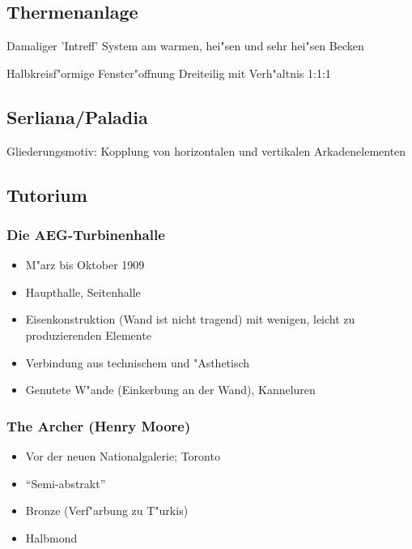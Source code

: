 \documentclass[emulatestandardclasses]{scrartcl}
\begin{document}
\subsection{Thermenanlage}

\begin{description}[leftmargin=!,labelwidth=\widthof{\bfseries Thermenfenster}]
  \item[Hintergrund] Damaliger 'Intreff' System am warmen, hei"sen und sehr hei"sen Becken
  \item[Thermenfenster] Halbkreisf"ormige Fenster"offnung Dreiteilig mit Verh"altnis 1:1:1
\end{description}

\subsection{Serliana/Paladia}

Gliederungsmotiv: Kopplung von horizontalen und vertikalen Arkadenelementen



\subsection{Tutorium}

\subsubsection{Die AEG-Turbinenhalle}

\begin{itemize}
  \item M"arz bis Oktober 1909
  \item Haupthalle, Seitenhalle
  \item Eisenkonstruktion (Wand ist nicht tragend) mit wenigen, leicht zu produzierenden Elemente
  \item Verbindung aus technischem und "Asthetisch 
  \item Genutete W"ande (Einkerbung an der Wand), Kanneluren 
\end{itemize}


\subsubsection{The Archer (Henry Moore)}

\begin{itemize}
  \item Vor der neuen Nationalgalerie; Toronto
  \item "`Semi-abstrakt"'
  \item Bronze (Verf"arbung zu T"urkis)
  \item Halbmond
\end{itemize}
\end{document}
